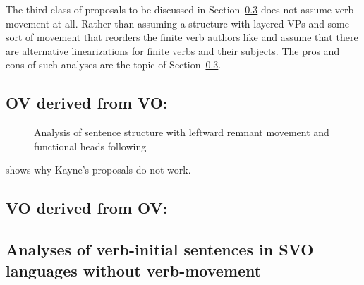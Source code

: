 The third class of proposals to be discussed in Section~\ref{sec-aux-flat} does not assume verb movement at
all. Rather than assuming a structure with layered VPs and some sort of movement that reorders the
finite verb authors like \citet*{GKPS85a} and \citet{Sag2018a} assume that there are alternative
linearizations for finite verbs and their subjects. The pros and cons of such analyses are the topic
of Section~\ref{sec-aux-flat}.

\subsection{OV derived from VO: \citet{Kayne94a-u}}

\citet{Kayne94a-u} 


\begin{figure}
\caption{\label{Abbildung-Remnant-Movement-Satzstruktur}Analysis of sentence structure with leftward remnant movement
  and functional heads following \citet[]{Laenzlinger2004a}}
\end{figure}%

\citet{Haider2000a} shows why Kayne's proposals do not work.

\subsection{VO derived from OV: \citet{Haider2017b-u}}

\citet{Haider2000a,Haider2017b-u}

\subsection{Analyses of verb-initial sentences in SVO languages without verb-movement}
\label{sec-aux-flat}

